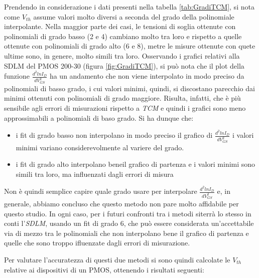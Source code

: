 \documentclass[12pt, letterpaper]{book}
\begin{document}
Prendendo in considerazione i dati presenti nella tabella \ref{tab:GradiTCM}, si nota come $V_{th}$ assume valori molto diversi a seconda del grado della polinomiale interpolante. Nella maggior parte dei casi, le tensioni di soglia ottenute con polinomiali di grado basso (2 e 4) cambiano molto tra loro e rispetto a quelle ottenute con polinomiali di grado alto (6 e 8), metre le misure ottenute con quete ultime sono, in genere, molto simili tra loro. Osservando i grafici relativi alla SDLM del PMOS 200-30 (figura \ref{fig:GradiTCM}), si può nota che il plot della funzione $\frac{d^2lnI_D}{dV_{GS}^2}$ ha un andamento che non viene interpolato in modo preciso da polinomiali di basso grado, i cui valori minimi, quindi, si discostano parecchio dai minimi ottenuti con polinomiali di grado maggiore. Risulta, infatti, che  è più sensibile agli errori di misurazioni rispetto a \emph{TCM} e quindi i grafici sono meno approssimabili a polinomiali di baso grado. Si ha dunque che:
\begin{itemize}
  \item i fit di grado basso non interpolano in modo preciso il grafico di $\frac{d^2lnI_D}{dV_{GS}^2}$ i valori minimi variano considerevolmente al variere del grado.
  \item i fit di grado alto interpolano beneil grafico di partenza e i valori minimi sono simili tra loro, ma influenzati dagli errori di misura
\end{itemize}

Non è quindi semplice capire quale grado usare per interpolare $\frac{d^2lnI_D}{dV_{GS}^2}$ e, in generale, abbiamo concluso che questo metodo non pare molto affidabile per questo studio. In ogni caso, per i futuri confronti tra i metodi siterrà lo stesso in conti l'\emph{SDLM}, usando un fit di grado 6, che può essere considerata un'accettabile via di mezzo tra le polinomiali che non interpolano bene il grafico di partenza e quelle che sono troppo ifluenzate dagli errori di misurazione.









Per valutare l'accuratezza di questi due metodi si sono quindi calcolate le $V_{th}$ relative ai dispositivi di un PMOS, ottenendo i risultati seguenti:
\end{document}
